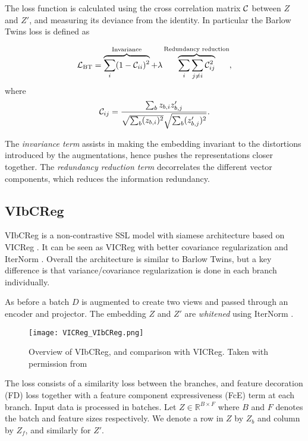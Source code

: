 \documentclass[../../thesis.tex]{subfiles}
\begin{document}
The loss function is calculated using the cross correlation matrix $\mathcal{C}$ between $Z$ and $Z'$, and measuring its deviance from the identity. In particular the Barlow Twins loss is defined as

\begin{equation}
    \label{eq:BTLoss}
    \mathcal{L}_{\text{BT}} = 
    \overbrace{\sum_i (1 - \mathcal{C}_{ii})^2}^{\text{Invariance}}
    +\lambda  \overbrace{\sum_i\sum_{j\neq i} \mathcal{C}_{ij}^2}^{\text{Redundancy reduction}},
\end{equation}
where
\begin{equation}
    \mathcal{C}_{ij} = \frac{\sum_b z_{b,i}z_{b,j}'}{\sqrt{\sum_b (z_{b,i})^2}\sqrt{\sum_b (z_{b,j}')^2}}.
\end{equation}

The \textit{invariance term} assists in making the embedding invariant to the distortions introduced by the augmentations, hence pushes the representations closer together. The \textit{redundancy reduction term} decorrelates the different vector components, which reduces the information redundancy. \newline



\subsection{VIbCReg}

VIbCReg \cite{lee2024vibcreg} is a non-contrastive SSL model with siamese architecture based on VICReg \cite{bardes2022vicreg}. It can be seen as VICReg with better covariance regularization and IterNorm \cite{huang2019iterative}. Overall the architecture is similar to Barlow Twins, but a key difference is that variance/covariance regularization is done in each branch individually.\newline

As before a batch $D$ is augmented to create two views and passed through an encoder and projector. The embedding $Z$ and $Z'$ are \textit{whitened}  using IterNorm \cite{huang2019iterative}.\newline

\begin{figure}[h]
    \texttt{[image: VICReg\_VIbCReg.png]}
    \centering    
    \caption{Overview of VIbCReg, and comparison with VICReg. Taken with permission from \cite{lee2024computer}}
\end{figure}

The loss consists of a similarity loss between the branches, and feature decoration (FD) loss together with a feature component expressiveness (FcE) term at each branch. Input data is processed in batches. Let $Z \in \mathbb{R}^{B\times F}$ where $B$ and $F$ denotes the batch and feature sizes respectively. We denote a row in $Z$ by $Z_b$ and column by $Z_f$, and similarly for $Z'$. \newline
\end{document}
